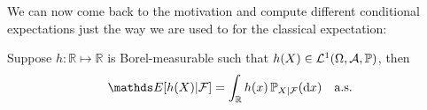 We can now come back to the motivation and compute different conditional expectations just the way we are used to for the classical expectation:
\begin{laussagewerkzeug}
\begin{prop}
	Suppose $h:\mathbb{R}\mapsto\mathbb{R}$ is Borel-measurable such that $h(X)\in \mathcal L^1(\Omega, \mathcal A, \P)$, then
 \begin{align*}
 	\mathds E[ h(X) |  \cF] =  \int_{\mathbb{R}} h(x)\,\P_{X|\mathcal F}(\mathrm dx)\quad\text{a.s.}
\end{align*}
\end{prop}
\end{laussagewerkzeug}

